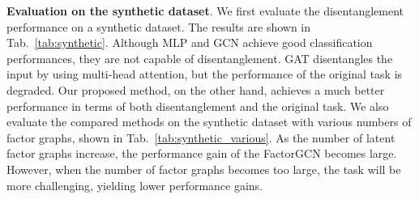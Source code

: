 \documentclass{article}
\begin{document}
\begin{table}
  \caption{Performance on synthetic dataset. The four methods are  evaluated in terms of 
  the classification and the disentanglement performance. Classification performance
  is evaluated by Micro-F1 and disentanglement performance is measured by GED and C-Score. For each method,
  we run the experiments five times and report the mean and std. Random method generates four factor graphs. 
  GAT\_W/Dis represents GAT model with
  the additional discriminator proposed in this paper.}
  \label{tab:synthetic}
  \centering
\end{table}

\textbf{Evaluation on the synthetic dataset}. We first evaluate the disentanglement 
performance on a synthetic dataset. The results are shown in Tab.~\ref{tab:synthetic}.
Although MLP and GCN achieve  good classification performances, they are not capable of disentanglement. 
GAT  disentangles the input by using multi-head attention,
but the performance of the original task is degraded. 
Our proposed method,
on the other hand, achieves a much better performance in terms of both disentanglement and
the original task.
We also evaluate the compared methods on the synthetic dataset with various numbers of 
factor graphs, shown in Tab.~\ref{tab:synthetic_various}. 
As the number of
latent factor graphs increase, the performance gain of the FactorGCN becomes large.
However, when the number of factor graphs becomes too large, 
the task will be more challenging,
yielding lower performance gains.
\end{document}
